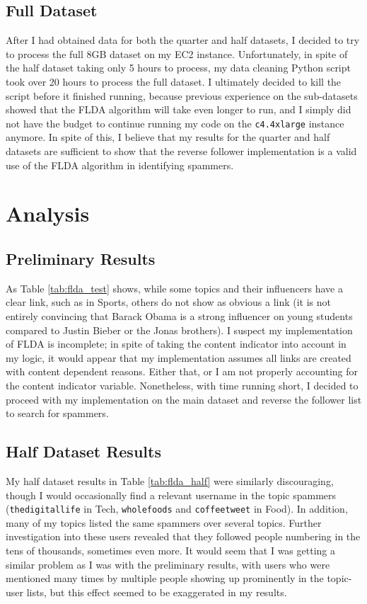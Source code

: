 \documentclass[a4paper]{article}
\begin{document}
\subsection{Full Dataset}
After I had obtained data for both the quarter and half datasets, I decided to try to process the full 8GB dataset on my EC2 instance. Unfortunately, in spite of the half dataset taking only 5 hours to process, my data cleaning Python script took over 20 hours to process the full dataset. I ultimately decided to kill the script before it finished running, because previous experience on the sub-datasets showed that the FLDA algorithm will take even longer to run, and I simply did not have the budget to continue running my code on the \verb+c4.4xlarge+ instance anymore. In spite of this, I believe that my results for the quarter and half datasets are sufficient to show that the reverse follower implementation is a valid use of the FLDA algorithm in identifying spammers.

\section{Analysis}
\label{sec:analysis}
\subsection{Preliminary Results}
As Table \ref{tab:flda_test} shows, while some topics and their influencers have a clear link, such as in Sports, others do not show as obvious a link (it is not entirely convincing that Barack Obama is a strong influencer on young students compared to Justin Bieber or the Jonas brothers). I suspect my implementation of FLDA is incomplete; in spite of taking the content indicator into account in my logic, it would appear that my implementation assumes all links are created with content dependent reasons. Either that, or I am not properly accounting for the content indicator variable. Nonetheless, with time running short, I decided to proceed with my implementation on the main dataset and reverse the follower list to search for spammers.

\subsection{Half Dataset Results}
My half dataset results in Table \ref{tab:flda_half} were similarly discouraging, though I would occasionally find a relevant username in the topic spammers (\verb+thedigitallife+ in Tech, \verb+wholefoods+ and \verb+coffeetweet+ in Food). In addition, many of my topics listed the same spammers over several topics. Further investigation into these users revealed that they followed people numbering in the tens of thousands, sometimes even more. It would seem that I was getting a similar problem as I was with the preliminary results, with users who were mentioned many times by multiple people showing up prominently in the topic-user lists, but this effect seemed to be exaggerated in my results.
\end{document}
